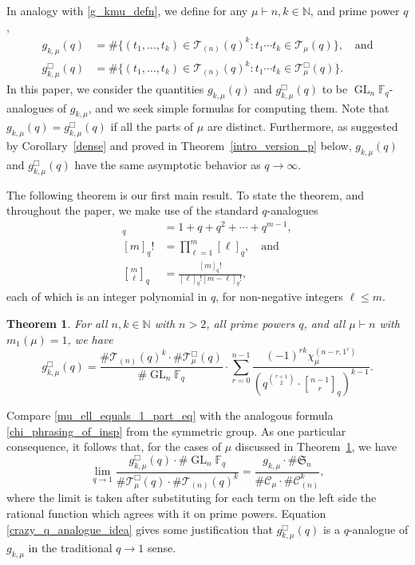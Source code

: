 \documentclass[10pt]{article}
\newtheorem{theorem}{Theorem}[section]
\theoremstyle{definition}
\DeclareMathOperator{\GL}{GL}
\newcommand{\CC}{\mathcal{C}}
\newcommand{\F}{\mathbb{F}}
\newcommand{\N}{\mathbb{N}}
\newcommand{\FS}{\mathfrak{S}}
\newcommand{\CT}{\mathcal{T}}
\begin{document}
In analogy with \eqref{g_kmu_defn}, we define for any \(\mu \vdash n, k \in \N\), and prime power \(q\),
\begin{align*}
g_{k,\mu} (q)
& =
\# \{ (t_1,\ldots,t_k) \in \CT_{(n)} (q)^k : t_1 \cdots t_k \in \CT_\mu (q) \}, \quad \text{and} \\
g_{k,\mu}^\Box (q)
& =
\# \{ (t_1,\ldots,t_k) \in \CT_{(n)} (q)^k : t_1 \cdots t_k \in \CT_\mu^\Box (q) \}.
\end{align*}
In this paper, we consider the quantities \(g_{k,\mu}(q)\) and \(g_{k,\mu}^\Box (q)\) to be \(\GL_n \F_q\)-analogues of \(g_{k,\mu}\),
and we seek simple formulas for computing them.
Note that \(g_{k,\mu} (q) = g_{k,\mu}^\Box (q)\) if all the parts of \(\mu\) are distinct.
Furthermore, as suggested by Corollary~\ref{dense} and proved in Theorem~\ref{intro_version_p} below, \(g_{k,\mu} (q)\) and \(g_{k,\mu}^\Box (q)\) have the same asymptotic behavior as \(q \to \infty\).

The following theorem is our first main result.
To state the theorem, and throughout the paper, we make use of the standard \(q\)-analogues
\begin{align}
[m]_q  & = 1 + q + q^2 + \cdots + q^{m-1},
\label{x_analogue_of_n}\\
[m]_q! & = \prod_{\ell = 1}^{m} [\ell]_q, \quad \text{and}
\label{x_analogue_of_n_factorial}\\
{\genfrac[]{0pt}{1}{m}{\ell}}_q
& = \frac{[m]_q!}{[\ell]_q! [m-\ell]_q!},
\label{x_analogue_of_n_choose_k}
\end{align}
each of which is an integer polynomial in \(q\), for non-negative integers \(\ell \leq m\).


\begin{theorem}
\label{re_main}
For all \(n, k \in \N\) with \(n > 2\), all prime powers \(q\), and all \(\mu \vdash n\) with \(m_1(\mu) = 1\), we have
\begin{equation}
\label{mu_ell_equals_1_part_eq}
g_{k,\mu}^\Box(q)
=
\frac{\# \CT_{(n)} (q)^k
\cdot
\# \CT_\mu^\Box (q)}{\# \GL_n \F_q}
\cdot
\sum_{r=0}^{n-1}
\frac{(-1)^{rk} \chi^{(n-r,1^r)}_\mu}{\left ( q^{\binom{r+1}{2}} \cdot {\genfrac[]{0pt}{1}{n - 1}{r}}_{q} \right )^{k-1}}.
\end{equation}
\end{theorem}

Compare \eqref{mu_ell_equals_1_part_eq} with the analogous formula \eqref{chi_phrasing_of_insp} from the symmetric group.
As one particular consequence, it follows that, for the cases of \(\mu\) discussed in Theorem~\ref{re_main}, we have
\begin{equation}
\label{crazy_q_analogue_idea}
\lim_{q \to 1}
\frac{g_{k,\mu}^\Box (q) \cdot \# \GL_n \F_q }{\# \CT^\Box_\mu (q) \cdot \# \CT_{(n)} (q)^k }
=
\frac{g_{k,\mu} \cdot \# \FS_n}{\# \CC_\mu \cdot \# \CC_{(n)}^k},
\end{equation}
where the limit is taken after substituting for each term on the left side the rational function which agrees with it on prime powers.
Equation \eqref{crazy_q_analogue_idea} gives some justification that \(g_{k,\mu}^\Box (q)\) is a \(q\)-analogue of \(g_{k,\mu}\) in the traditional \(q \to 1\) sense.
\end{document}
